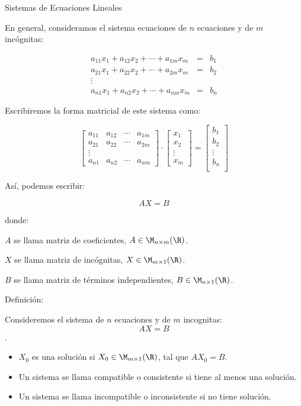 {Sistemas de Ecuaciones Lineales}

En general, consideramos el sistema ecuaciones de $n$ ecuaciones y de $m$ incógnitas:

\begin{eqnarray*}
a_{11}x_1   +   a_{12}x_2   +   \cdots   +   a_{1m}x_m   &=&   b_1\\
a_{21}x_1   +   a_{22}x_2   +   \cdots   +   a_{2m}x_m   &=&   b_2\\
\vdots\\
a_{n1}x_1   +   a_{n2}x_2   +   \cdots   +   a_{nm}x_m   &=&   b_n
\end{eqnarray*}

Escribiremos la forma matricial de este sistema como:

 $$ \begin{bmatrix}
a_{11}    &  a_{12}  & \cdots &  a_{1m}\\
a_{21}    &  a_{22}  & \cdots &  a_{2m}\\
\vdots\\
a_{n1}    &  a_{n2}  & \cdots &  a_{nm}
\end{bmatrix}
\cdot
 \begin{bmatrix}
x_1 \\
x_2\\
\vdots\\
x_m
\end{bmatrix}
=
 \begin{bmatrix}
b_1 \\
b_2 \\
\vdots\\
b_n \\
\end{bmatrix}
$$


Así, podemos escribir: 

$$AX=B$$

donde:

 $A$ se llama matriz de coeficientes,  $A \in \M_{n\times m}(\R)$.

 $X$ se llama matriz de incógnitas,  $X \in \M_{m\times 1}(\R)$.
 
 $B$ se llama matriz de términos independientes,  $B \in \M_{n\times 1}(\R)$.

Definición: 

Consideremos el sistema de  $n$ ecuaciones y de $m$ incognitas:
$$AX=B$$.

\begin{itemize}
\item
$X_0$ es una solución si $X_0 \in \M_{m\times 1}(\R)$, tal que $AX_0=B$.

\item
Un sistema se llama compatible o consistente si tiene al menos una solución.

\item
Un sistema se llama incompatible o inconsistente si no tiene solución.
\end{itemize}


